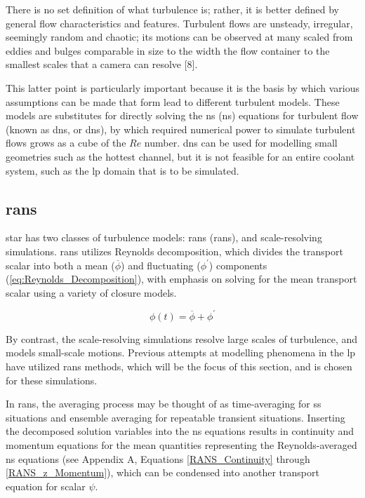 \documentclass[double,12pt]{beavtex}
\begin{document}
There is no set definition of what turbulence is; rather, it is better defined by general flow characteristics and features. Turbulent flows are unsteady, irregular, seemingly random and chaotic; its motions can be observed at many scaled from eddies and bulges comparable in size to the width the flow container to the smallest scales that a camera can resolve [8]. 

This latter point is particularly important because it is the basis by which various assumptions can be made that form lead to different turbulent models. These models are substitutes for directly solving the \acrlong{ns} (\acrshort{ns}) equations for turbulent flow (known as \acrlong{dns}, or \acrshort{dns}), by which required numerical power to simulate turbulent flows grows as a cube of the $Re$ number. \acrshort{dns} can be used for modelling small geometries such as the hottest channel, but it is not feasible for an entire coolant system, such as the \acrshort{lp} domain that is to be simulated.

\subsection{\acrlong{rans}}

\acrshort{star} has two classes of turbulence models: \acrlong{rans} (\acrshort{rans}), and scale-resolving simulations. \acrshort{rans} utilizes Reynolds decomposition, which divides the transport scalar into both a mean ($\overline{\phi}$) and fluctuating ($\phi^{'}$) components (\ref{eq:Reynolds_Decomposition}), with emphasis on solving for the mean transport scalar using a variety of closure models. 

\begin{equation}
    \phi(t) = \overline{\phi} + \phi^{'}
\label{eq:Reynolds_Decomposition}
\end{equation}

By contrast, the scale-resolving simulations resolve large scales of turbulence, and models small-scale motions.  Previous attempts at modelling phenomena in the \acrshort{lp} have utilized \acrshort{rans} methods, which will be the focus of this section, and is chosen for these simulations.

In \acrshort{rans}, the averaging process may be thought of as time-averaging for \acrshort{ss} situations and ensemble averaging for repeatable transient situations. Inserting the decomposed solution variables into the \acrshort{ns} equations results in continuity and momentum equations for the mean quantities representing the Reynolds-averaged \acrshort{ns} equations (see Appendix A, Equations \ref{RANS_Continuity} through \ref{RANS_z_Momentum}), which can be condensed into another transport equation for scalar $\psi$. 
\end{document}
